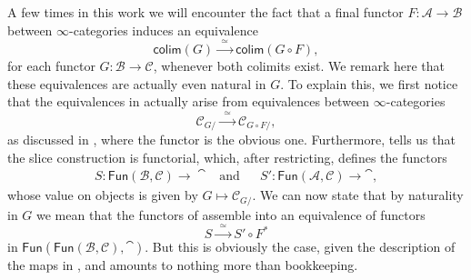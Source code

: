\documentclass[../text]{subfiles}
\begin{document}
\begin{remark}\label{rem:fin_equiv_natural}
    A few times in this work we will encounter the fact that a final functor $F: \mathscr{A} \xrightarrow{} \mathscr{B}$ between $\infty$-categories induces an equivalence
    \begin{equation}\label{eq:fin_equivs_obj}
        \mathsf{colim}(G) \xrightarrow{\ \ \simeq \ \ } \mathsf{colim}(G \circ F),
    \end{equation}
    for each functor $G: \mathscr{B} \xrightarrow{} \mathscr{C}$, whenever both colimits exist. We remark here that these equivalences are actually even natural in $G$. To explain this, we first notice that the equivalences in  actually arise from equivalences between $\infty$-categories
    \begin{equation}\label{eq:fin_equivs_cat}
        \mathscr{C}_{G/} \xrightarrow{\ \ \simeq \ \ } \mathscr{C}_{G \circ F /},
    \end{equation}
    as discussed in \cite[prop.4.1.1.8]{lurie_htt}, where the functor is the obvious one. Furthermore, \cite[\href{https://kerodon.net/tag/016H}{016H}]{lurie_kerodon} tells us that the slice construction is functorial, which, after restricting, defines the functors
    \begin{align}
        &S: \mathsf{Fun}(\mathscr{B}, \mathscr{C}) \xrightarrow{\ \ \ } \cat& \mathrm{and}& &S': \mathsf{Fun}(\mathscr{A}, \mathscr{C}) \xrightarrow{\ \ \ } \cat,&
    \end{align}
    whose value on objects is given by $G \mapsto \mathscr{C}_{G/}$. We can now state that by naturality in $G$ we mean that the functors of  assemble into an equivalence of functors   
    \begin{equation}
        S \xrightarrow{\ \ \simeq \ \ } S' \circ F^*
    \end{equation}
    in $\mathsf{Fun}(\mathsf{Fun(\mathscr{B}, \mathscr{C})}, \cat)$. But this is obviously the case, given the description of the maps in , and amounts to nothing more than bookkeeping.
\end{remark}
\end{document}
